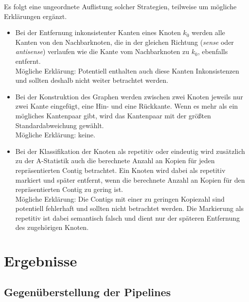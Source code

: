 \documentclass[a4paper,11pt,parskip]{scrartcl}
\begin{document}
Es folgt eine ungeordnete Auflistung solcher Strategien, teilweise um
mögliche Erklärungen ergänzt.
\begin{itemize}
\item Bei der Entfernung inkonsistenter Kanten eines Knoten $k_0$
  werden alle Kanten von den Nachbarknoten, die in der gleichen
  Richtung (\textit{sense} oder \textit{antisense}) verlaufen wie die
  Kante vom Nachbarknoten zu $k_0$, ebenfalls entfernt. \\
  Mögliche Erklärung: Potentiell enthalten auch diese Kanten
  Inkonsistenzen und sollten deshalb nicht weiter betrachtet werden.
\item Bei der Konstruktion des Graphen werden zwischen zwei Knoten
  jeweils nur zwei Kante eingefügt, eine Hin- und eine Rückkante.
  Wenn es mehr als ein mögliches Kantenpaar gibt, wird das Kantenpaar mit der
  größten Standardabweichung gewählt. \\
  Mögliche Erklärung: keine.
\item Bei der Klassifikation der Knoten als repetitiv oder eindeutig
  wird zusätzlich zu der A-Statistik auch die berechnete Anzahl an
  Kopien für jeden repräsentierten Contig betrachtet. Ein Knoten wird
  dabei als repetitiv markiert und später entfernt, wenn die
  berechnete Anzahl an Kopien für den repräsentierten Contig zu gering
  ist. \\
  Mögliche Erklärung: Die Contigs mit einer zu geringen
  Kopiezahl sind potentiell fehlerhaft und sollten nicht betrachtet
  werden. Die Markierung als repetitiv ist dabei semantisch falsch und
  dient nur der späteren Entfernung des zugehörigen Knoten.
\end{itemize}

\section{Ergebnisse}
\label{sec: Ergebnisse}
\subsection{Gegenüberstellung der Pipelines}
\end{document}
